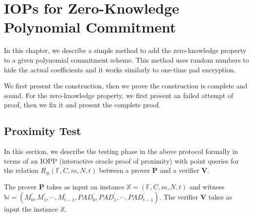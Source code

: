 \chapter{IOPs for Zero-Knowledge Polynomial Commitment}

In this chapter, we describe a simple method to add the zero-knowledge property to a given polynomial commitment scheme. This method uses random numbers to hide the actual coefficients and it works similarly to one-time pad encryption.

We first present the construction, then we prove the construction is complete and sound. For the zero-knowledge property, we first present an failed attempt of proof, then we fix it and present the complete proof.

\section{Proximity Test}

In this section, we describe the testing phase in the above protocol formally in terms of an IOPP (interactive oracle proof of proximity) with point queries for the relation $R_\otimes(\mathbb{F}, C, m, N, t)$ between a prover $\textbf{P}$ and a verifier $\textbf{V}$.

The prover $\textbf{P}$ takes as input an instance $\mathbb{X} = (\mathbb{F}, C, m, N, t)$ and witness $\mathbb{W} = (M_0^{\prime}, M_1^{\prime}, \cdots, M_{t-1}^{\prime}, PAD_0^{\prime}, PAD_1^{\prime}, \cdots, PAD_{t-1}^{\prime})$. The verifier $\textbf{V}$ takes as input the instance $\mathbb{X}$.

